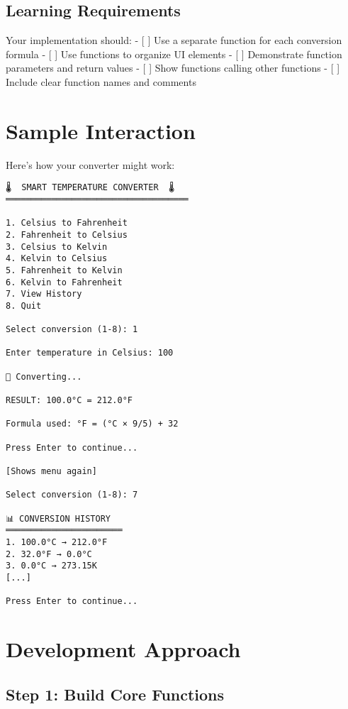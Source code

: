 \documentclass[
  letterpaper,
  DIV=11,
  numbers=noendperiod,
  oneside]{scrreprt}
\begin{document}
\subsection{Learning Requirements}\label{learning-requirements-4}

Your implementation should: - {[} {]} Use a separate function for each
conversion formula - {[} {]} Use functions to organize UI elements - {[}
{]} Demonstrate function parameters and return values - {[} {]} Show
functions calling other functions - {[} {]} Include clear function names
and comments

\section{Sample Interaction}\label{sample-interaction-4}

Here's how your converter might work:

\begin{verbatim}
🌡️  SMART TEMPERATURE CONVERTER  🌡️
════════════════════════════════════

1. Celsius to Fahrenheit
2. Fahrenheit to Celsius  
3. Celsius to Kelvin
4. Kelvin to Celsius
5. Fahrenheit to Kelvin
6. Kelvin to Fahrenheit
7. View History
8. Quit

Select conversion (1-8): 1

Enter temperature in Celsius: 100

🔄 Converting...

RESULT: 100.0°C = 212.0°F

Formula used: °F = (°C × 9/5) + 32

Press Enter to continue...

[Shows menu again]

Select conversion (1-8): 7

📊 CONVERSION HISTORY
═══════════════════════
1. 100.0°C → 212.0°F
2. 32.0°F → 0.0°C
3. 0.0°C → 273.15K
[...]

Press Enter to continue...
\end{verbatim}

\section{Development Approach}\label{development-approach-4}

\subsection{Step 1: Build Core
Functions}\label{step-1-build-core-functions}
\end{document}
